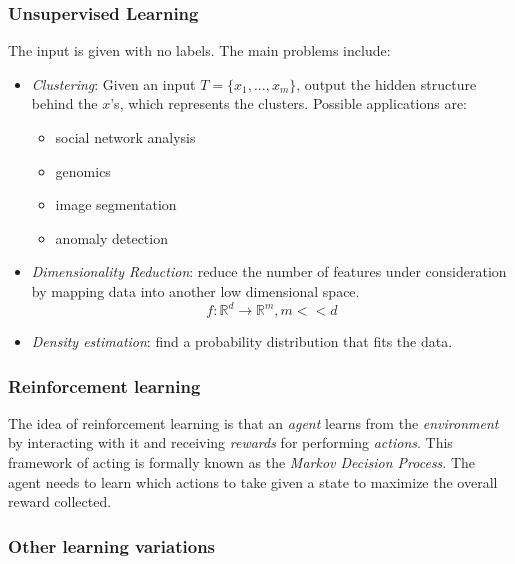 \documentclass[11pt]{article}
\begin{document}
\subsubsection{Unsupervised Learning}\label{unsupervised-learning}

The input is given with no labels. The main problems include:

\begin{itemize}
\tightlist
\item
  \emph{Clustering}: Given an input \(T = \{x_1, ..., x_m\}\), output
  the hidden structure behind the \(x\)'s, which represents the
  clusters. Possible applications are:

  \begin{itemize}
  \tightlist
  \item
    social network analysis
  \item
    genomics
  \item
    image segmentation
  \item
    anomaly detection
  \end{itemize}
\item
  \emph{Dimensionality Reduction}: reduce the number of features under
  consideration by mapping data into another low dimensional space.
  \[ f: \mathbb{R}^d \rightarrow \mathbb{R}^m, m << d \]
\item
  \emph{Density estimation}: find a probability distribution that fits
  the data.
\end{itemize}

\subsubsection{\texorpdfstring{\textbf{Reinforcement
learning}}{Reinforcement learning}}\label{reinforcement-learning}

The idea of reinforcement learning is that an \emph{agent} learns from
the \emph{environment} by interacting with it and receiving
\emph{rewards} for performing \emph{actions}. This framework of acting
is formally known as the \emph{Markov Decision Process}. The agent needs
to learn which actions to take given a state to maximize the overall
reward collected.

\subsubsection{Other learning
variations}\label{other-learning-variations}
\end{document}
